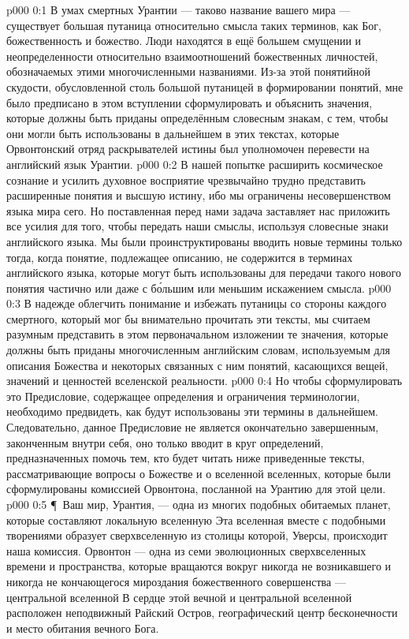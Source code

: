 \uforeword
\vs p000 0:1 В умах смертных Урантии --- таково название вашего мира --- существует большая путаница относительно смысла таких терминов, как Бог, божественность и божество. Люди находятся в ещё большем смущении и неопределенности относительно взаимоотношений божественных личностей, обозначаемых этими многочисленными названиями. Из-за этой понятийной скудости, обусловленной столь большой путаницей в формировании понятий, мне было предписано в этом вступлении сформулировать и объяснить значения, которые должны быть приданы определённым словесным знакам, с тем, чтобы они могли быть использованы в дальнейшем в этих текстах, которые Орвонтонский отряд раскрывателей истины был уполномочен перевести на английский язык Урантии.
\vs p000 0:2 В нашей попытке расширить космическое сознание и усилить духовное восприятие чрезвычайно трудно представить расширенные понятия и высшую истину, ибо мы ограничены несовершенством языка мира сего. Но поставленная перед нами задача заставляет нас приложить все усилия для того, чтобы передать наши смыслы, используя словесные знаки английского языка. Мы были проинструктированы вводить новые термины только тогда, когда понятие, подлежащее описанию, не содержится в терминах английского языка, которые могут быть использованы для передачи такого нового понятия частично или даже с б\'ольшим или меньшим искажением смысла.
\vs p000 0:3 В надежде облегчить понимание и избежать путаницы со стороны каждого смертного, который мог бы внимательно прочитать эти тексты, мы считаем разумным представить в этом первоначальном изложении те значения, которые должны быть приданы многочисленным английским словам, используемым для описания Божества и некоторых связанных с ним понятий, касающихся вещей, значений и ценностей вселенской реальности.
\vs p000 0:4 Но чтобы сформулировать это Предисловие, содержащее определения и ограничения терминологии, необходимо предвидеть, как будут использованы эти термины в дальнейшем. Следовательно, данное Предисловие не является окончательно завершенным, законченным внутри себя, оно только вводит в круг определений, предназначенных помочь тем, кто будет читать ниже приведенные тексты, рассматривающие вопросы о Божестве и о вселенной вселенных, которые были сформулированы комиссией Орвонтона, посланной на Урантию для этой цели.
\vs p000 0:5 \P\ Ваш мир, Урантия, --- одна из многих подобных обитаемых планет, которые составляют локальную вселенную  Эта вселенная вместе с подобными творениями образует сверхвселенную  из столицы которой, Уверсы, происходит наша комиссия. Орвонтон --- одна из семи эволюционных сверхвселенных времени и пространства, которые вращаются вокруг никогда не возникавшего и никогда не кончающегося мироздания божественного совершенства --- центральной вселенной  В сердце этой вечной и центральной вселенной расположен неподвижный Райский Остров, географический центр бесконечности и место обитания вечного Бога.
